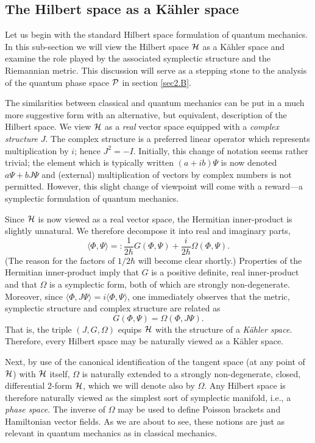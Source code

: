 \documentclass[12pt,aps,eqsecnum,tighten]{revtex4-2}
\def\be{\begin{equation}}
\def\ee{\end{equation}}
\def\<{\langle}
\def\>{\rangle}
\def\i{{i}}
\def\H{{\cal H}}
\def\P{{\cal P}}
\def\W{\Omega}
\begin{document}
\subsection{The Hilbert space as a K\"ahler space}
\label{sec2.A}

Let us begin with the standard Hilbert space formulation of quantum
mechanics.  In this sub-section we will view the Hilbert space $\H$ as
a K\"ahler space and examine the role played by the associated
symplectic structure and the Riemannian metric.  This discussion will
serve as a stepping stone to the analysis of the quantum phase space
$\P$ in section \ref{sec2.B}.

The similarities between classical and quantum mechanics can be put in
a much more suggestive form with an alternative, but equivalent,
description of the Hilbert space.  We view $\H$ as a {\em real} vector
space equipped with a {\em complex structure} $J$.  The complex
structure is a preferred linear operator which represents
multiplication by $\i$; hence $J^2 = -{I}$.  Initially, this change of
notation seems rather trivial; the element which is typically written
$(a + \i b)\Psi$ is now denoted $a\Psi + b J\Psi$ and (external)
multiplication of vectors by complex numbers is not permitted.
However, this slight change of viewpoint will come with a reward---a
symplectic formulation of quantum mechanics.

Since $\H$ is now viewed as a real vector space, the Hermitian
inner-product is slightly unnatural.  We therefore decompose it into
real and imaginary parts,
%
\be \< \Phi, \Psi\>
=: \frac{1}{2\hbar}G(\Phi, \Psi) + \frac{\i}{2\hbar}\W(\Phi, \Psi).
\ee 
%
(The reason for the factors of $1/2\hbar$ will become clear shortly.)
Properties of the Hermitian inner-product imply that $G$ is a positive
definite, real inner-product and that $\W$ is a symplectic form, both
of which are strongly non-degenerate.  Moreover, since $\<\Phi, J
\Psi\> = \i \<\Phi, \Psi\>$, one immediately observes that the metric,
symplectic structure and complex structure are related as
%
\be
\label{kahler_reln} G(\Phi, \Psi) = \W(\Phi, J \Psi).  
\ee 
%
That is, the triple $(J, G, \W)$ equips $\H$ with the structure of a
{\em K\"ahler space}.  Therefore, every Hilbert space may be naturally
viewed as a K\"ahler space.

Next, by use of the canonical identification of the tangent space (at
any point of $\H$) with $\H$ itself, $\W$ is naturally extended to a
strongly non-degenerate, closed, differential 2-form $\H$, which we
will denote also by $\W$.  Any Hilbert space is therefore naturally
viewed as the simplest sort of symplectic manifold, i.e., a {\em phase
space}.  The inverse of $\W$ may be used to define Poisson brackets
and Hamiltonian vector fields.  As we are about to see, these notions
are just as relevant in quantum mechanics as in classical mechanics.
\end{document}
